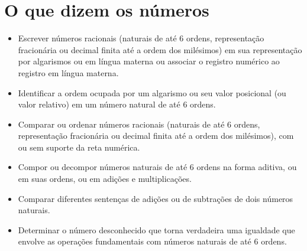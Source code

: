 \pagestyle{mat}
\chapter{O que dizem os números}


\begin{itemize}
  \item Escrever números racionais (naturais de até 6 ordens, representação
fracionária ou decimal finita até a ordem dos milésimos) em sua
representação por algarismos ou em língua materna ou associar o registro
numérico ao registro em língua materna.

  \item Identificar a ordem ocupada por um algarismo ou seu valor posicional
(ou valor relativo) em um número natural de até 6 ordens.

  \item Comparar ou ordenar números racionais (naturais de até 6 ordens,
representação fracionária ou decimal finita até a ordem dos milésimos),
com ou sem suporte da reta numérica.

  \item Compor ou decompor números naturais de até 6 ordens na forma aditiva,
ou em suas ordens, ou em adições e multiplicações.

  \item Comparar diferentes sentenças de adições ou de subtrações de dois
números naturais.

  \item Determinar o número desconhecido que torna verdadeira uma igualdade
que envolve as operações fundamentais com números naturais de até 6
ordens.
\end{itemize}


